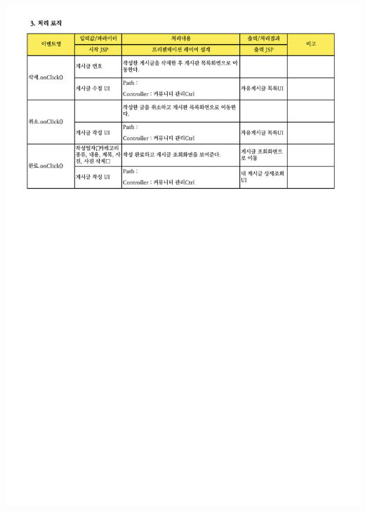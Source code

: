 {{{{{{{{{{{{{{{{{{{{{{{{{{{{{{{{{{{{{{{{{{{{{{{{{{{{{{{{{\includegraphics[width=20cm]{./Figure/Analysis/Display/community/community_16.pdf} \\
}}}}}}}}}}}}}}}}}}}}}}}}}}}}}}}}}}}}}}}}}}}}}}}}}}}}}}}}}
